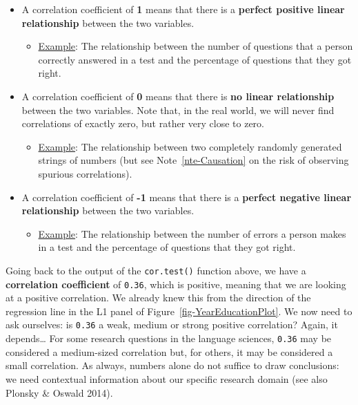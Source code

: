 \documentclass[
  letterpaper,
  DIV=11,
  numbers=noendperiod]{scrreprt}
\begin{document}
\begin{itemize}
\item
  A correlation coefficient of \textbf{1} means that there is a
  \textbf{perfect positive linear relationship} between the two
  variables.

  \begin{itemize}
  \item
    \ul{Example}: The relationship between the number of questions that
    a person correctly answered in a test and the percentage of
    questions that they got right.
  \end{itemize}
\item
  A correlation coefficient of \textbf{0} means that there is \textbf{no
  linear relationship} between the two variables. Note that, in the real
  world, we will never find correlations of exactly zero, but rather
  very close to zero.

  \begin{itemize}
  \item
    \ul{Example}: The relationship between two completely randomly
    generated strings of numbers (but see Note~\ref{nte-Causation} on
    the risk of observing spurious correlations).
  \end{itemize}
\item
  A correlation coefficient of \textbf{-1} means that there is a
  \textbf{perfect negative linear relationship} between the two
  variables.

  \begin{itemize}
  \item
    \ul{Example}: The relationship between the number of errors a person
    makes in a test and the percentage of questions that they got right.
  \end{itemize}
\end{itemize}

Going back to the output of the \texttt{cor.test()} function above, we
have a \textbf{correlation coefficient} of \texttt{0.36}, which is
positive, meaning that we are looking at a positive correlation. We
already knew this from the direction of the regression line in the L1
panel of Figure~\ref{fig-YearEducationPlot}. We now need to ask
ourselves: is \texttt{0.36} a weak, medium or strong positive
correlation? Again, it depends\ldots{} For some research questions in
the language sciences, \texttt{0.36} may be considered a medium-sized
correlation but, for others, it may be considered a small correlation.
As always, numbers alone do not suffice to draw conclusions: we need
contextual information about our specific research domain (see also
Plonsky \& Oswald 2014).
\end{document}
